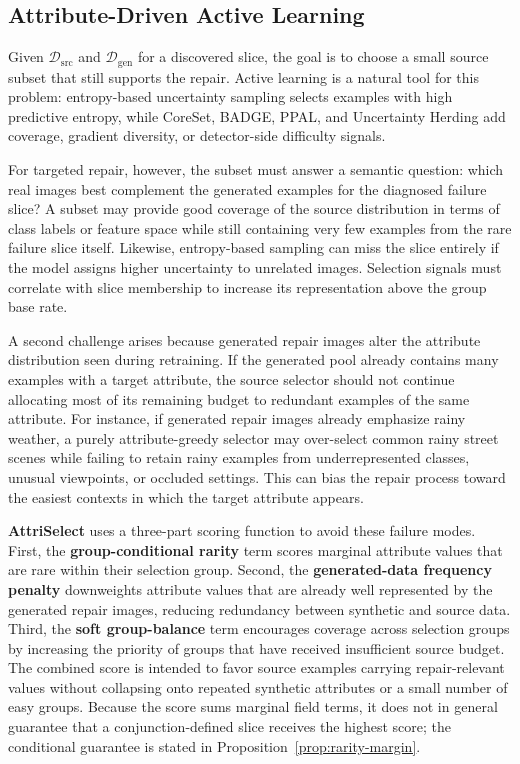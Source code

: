 \documentclass[10pt,twocolumn,letterpaper]{article}
\newcommand{\modelname}{AttriSelect}
\newcommand{\model}{\textcolor{darkteal}{\textbf{\modelname}}\xspace}
\newcommand{\dataset}{\mathcal{D}}
\begin{document}
\subsection{Attribute-Driven Active Learning}

Given $\dataset_{\mathrm{src}}$ and $\dataset_{\mathrm{gen}}$ for a discovered slice, the goal is to choose a small source subset that still supports the repair. Active learning is a natural tool for this problem: entropy-based uncertainty sampling selects examples with high predictive entropy, while CoreSet, BADGE, PPAL, and Uncertainty Herding add coverage, gradient diversity, or detector-side difficulty signals.

For targeted repair, however, the subset must answer a semantic question: which real images best complement the generated examples for the diagnosed failure slice? A subset may provide good coverage of the source distribution in terms of class labels or feature space while still containing very few examples from the rare failure slice itself. Likewise, entropy-based sampling can miss the slice entirely if the model assigns higher uncertainty to unrelated images. Selection signals must correlate with slice membership to increase its representation above the group base rate.

A second challenge arises because generated repair images alter the attribute distribution seen during retraining. If the generated pool already contains many examples with a target attribute, the source selector should not continue allocating most of its remaining budget to redundant examples of the same attribute. For instance, if generated repair images already emphasize rainy weather, a purely attribute-greedy selector may over-select common rainy street scenes while failing to retain rainy examples from underrepresented classes, unusual viewpoints, or occluded settings. This can bias the repair process toward the easiest contexts in which the target attribute appears.

\model uses a three-part scoring function to avoid these failure modes. First, the \textbf{group-conditional rarity} term scores marginal attribute values that are rare within their selection group. Second, the \textbf{generated-data frequency penalty} downweights attribute values that are already well represented by the generated repair images, reducing redundancy between synthetic and source data. Third, the \textbf{soft group-balance} term encourages coverage across selection groups by increasing the priority of groups that have received insufficient source budget. The combined score is intended to favor source examples carrying repair-relevant values without collapsing onto repeated synthetic attributes or a small number of easy groups. Because the score sums marginal field terms, it does not in general guarantee that a conjunction-defined slice receives the highest score; the conditional guarantee is stated in Proposition~\ref{prop:rarity-margin}.
\end{document}
